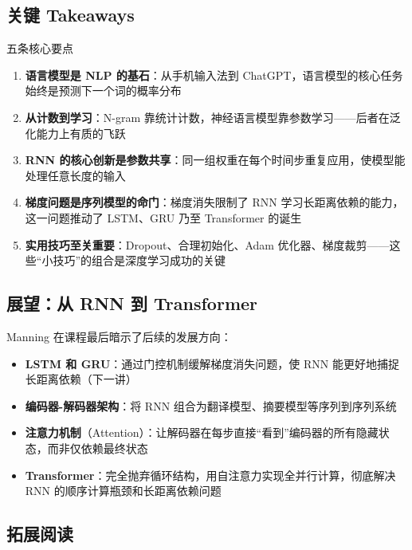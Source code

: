 \documentclass[a4paper]{article}
\begin{document}
\subsection{关键 Takeaways}

\begin{importantbox}{五条核心要点}
\begin{enumerate}
    \item \textbf{语言模型是 NLP 的基石}：从手机输入法到 ChatGPT，语言模型的核心任务始终是预测下一个词的概率分布
    \item \textbf{从计数到学习}：N-gram 靠统计计数，神经语言模型靠参数学习——后者在泛化能力上有质的飞跃
    \item \textbf{RNN 的核心创新是参数共享}：同一组权重在每个时间步重复应用，使模型能处理任意长度的输入
    \item \textbf{梯度问题是序列模型的命门}：梯度消失限制了 RNN 学习长距离依赖的能力，这一问题推动了 LSTM、GRU 乃至 Transformer 的诞生
    \item \textbf{实用技巧至关重要}：Dropout、合理初始化、Adam 优化器、梯度裁剪——这些``小技巧''的组合是深度学习成功的关键
\end{enumerate}
\end{importantbox}

\subsection{展望：从 RNN 到 Transformer}

Manning 在课程最后暗示了后续的发展方向：

\begin{itemize}
    \item \textbf{LSTM 和 GRU}：通过门控机制缓解梯度消失问题，使 RNN 能更好地捕捉长距离依赖（下一讲）
    \item \textbf{编码器-解码器架构}：将 RNN 组合为翻译模型、摘要模型等序列到序列系统
    \item \textbf{注意力机制}（Attention）：让解码器在每步直接``看到''编码器的所有隐藏状态，而非仅依赖最终状态
    \item \textbf{Transformer}：完全抛弃循环结构，用自注意力实现全并行计算，彻底解决 RNN 的顺序计算瓶颈和长距离依赖问题
\end{itemize}

\subsection{拓展阅读}
\end{document}
